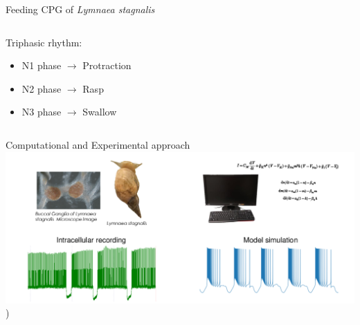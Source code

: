 \documentclass[aspectratio=43]{beamer}
\begin{document}
\begin{frame}{Feeding CPG of \textit{Lymnaea stagnalis}}
		\begin{columns}
			\begin{column}{0.45\textwidth}
				Triphasic rhythm:
				\begin{itemize}
					\item<1->{N1 phase $\rightarrow$ Protraction}
					\item<2->{N2 phase $\rightarrow$ Rasp}
					\item<3->{N3 phase $\rightarrow$ Swallow}
				\end{itemize}
			\end{column}
		\end{columns}
\end{frame}



\begin{frame}{Computational and Experimental approach}
	\includegraphics[width=\textwidth]{Images/experimental-computational.pdf})
\end{frame}
\end{document}
